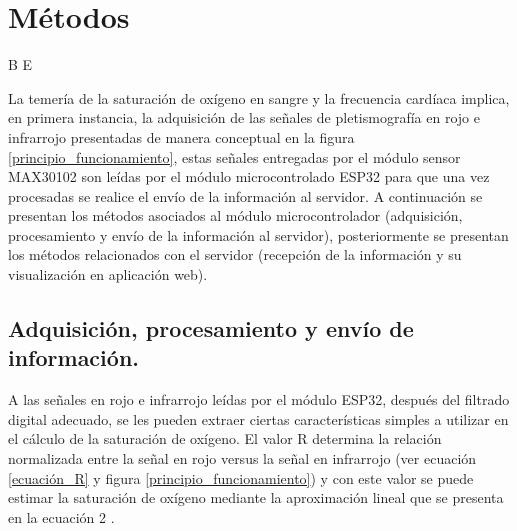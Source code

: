 \documentclass[journal]{IEEEtran}
\begin{document}








\section{Métodos}


{\color{blue}B E}


La temería de la saturación de oxígeno en sangre y la frecuencia cardíaca implica, en primera instancia, la adquisición de las señales de pletismografía en rojo e infrarrojo presentadas de manera conceptual en la figura \ref{principio_funcionamiento}, estas señales entregadas por el módulo sensor MAX30102 son leídas por el módulo microcontrolado ESP32 para que una vez procesadas se realice el envío de la información al servidor. A continuación se presentan los métodos asociados al módulo microcontrolador (adquisición, procesamiento y envío de la información al servidor), posteriormente se presentan los métodos relacionados con el servidor (recepción de la información y su visualización en aplicación web).

\subsection{Adquisición, procesamiento y envío de información.}
A las señales en rojo e infrarrojo leídas por el módulo ESP32, después del filtrado digital adecuado, se les pueden extraer ciertas características simples a utilizar en el cálculo de la saturación de oxígeno. El valor R determina la relación normalizada entre la señal en rojo versus la señal en infrarrojo (ver ecuación \ref{ecuación_R} y figura \ref{principio_funcionamiento}) y con este valor se puede estimar la saturación de oxígeno mediante la aproximación lineal que se presenta en la ecuación 2 \cite{E_FFT_Spo2}. 
\end{document}
